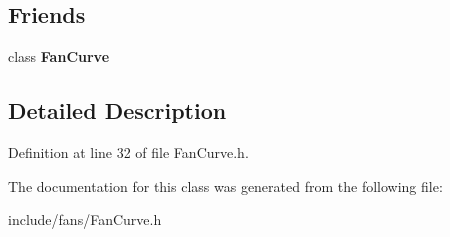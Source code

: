 \subsection*{Friends}
\begin{DoxyCompactItemize}
\item 
\mbox{\label{class_fan_curve_data_a5fd2f838324ef64e240da0dbd78e25b5}} 
class {\bfseries Fan\+Curve}
\end{DoxyCompactItemize}


\subsection{Detailed Description}


Definition at line 32 of file Fan\+Curve.\+h.



The documentation for this class was generated from the following file\+:\begin{DoxyCompactItemize}
\item 
include/fans/Fan\+Curve.\+h\end{DoxyCompactItemize}
